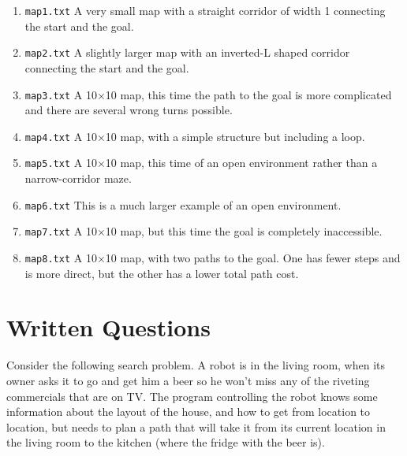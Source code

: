 \documentclass[12pt]{article}
\newcommand{\ttt}[1]{\texttt{#1}}
\begin{document}
\begin{enumerate}
\item \ttt{map1.txt} A very small map with a straight corridor of width 1
connecting the start and the goal.

\item \ttt{map2.txt} A slightly larger map with an inverted-L shaped corridor
connecting the start and the goal.

\item \ttt{map3.txt} A 10$\times$10 map, this time the path to the
goal is more complicated and there are several wrong turns possible.

\item \ttt{map4.txt} A 10$\times$10 map, with a simple structure but
including a loop.

\item \ttt{map5.txt} A 10$\times$10 map, this time of an open environment
rather than a narrow-corridor maze.

\item \ttt{map6.txt} This is a much larger example of an open environment.

\item \ttt{map7.txt} A 10$\times$10 map, but this time the goal is
completely inaccessible.

\item \ttt{map8.txt} A 10$\times$10 map, with two paths to the goal.  One has
fewer steps and is more direct, but the other has a lower total path cost.

\end{enumerate}


\section{Written Questions}

Consider the following search problem.  A robot is in the living room,
when its owner asks it to go and get him a beer so he won't miss any of the
riveting commercials that are on TV.  The program controlling the robot knows
some information about the layout of the house, and how to get from location to
location, but needs to plan a path that will take it from its current location
in the living room to the kitchen (where the fridge with the beer is).
\end{document}
